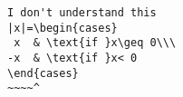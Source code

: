 \begin{verbatim}
I don't understand this
|x|=\begin{cases}
 x  & \text{if }x\geq 0\\\
-x  & \text{if }x< 0
\end{cases}
~~~~^
\end{verbatim}
